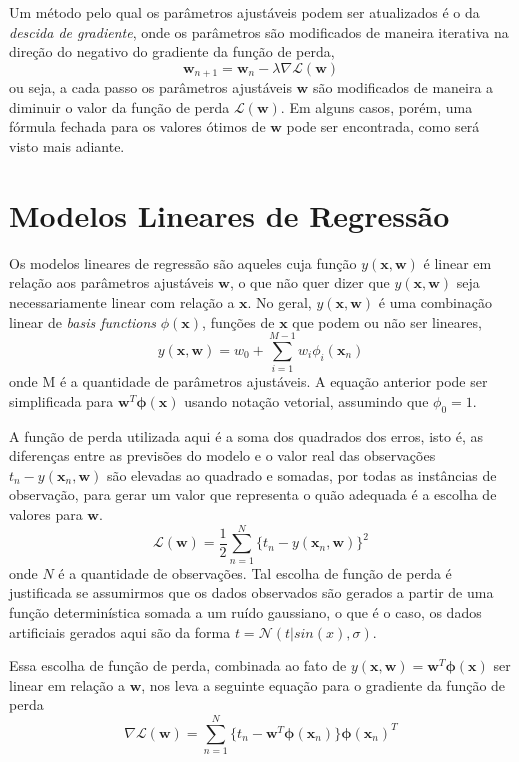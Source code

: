\documentclass{article}
\begin{document}
Um método pelo qual os parâmetros ajustáveis podem ser atualizados é o da \emph{descida de gradiente}, onde os parâmetros
são modificados de maneira iterativa na direção do negativo do gradiente da função de perda,
\[ \textbf{w}_{n + 1} = \textbf{w}_n - \lambda \nabla \mathcal{L}(\textbf{w}) \]
ou seja, a cada passo os parâmetros ajustáveis \( \textbf{w} \) são modificados de maneira a diminuir o valor da
função de perda \( \mathcal{L}(\textbf{w}) \). Em alguns casos, porém, uma fórmula fechada para os valores ótimos de \( \textbf{w} \)
pode ser encontrada, como será visto mais adiante.

\section{Modelos Lineares de Regressão}

Os modelos lineares de regressão são aqueles cuja função \( y(\textbf{x}, \textbf{w}) \) é linear em relação aos parâmetros
ajustáveis \( \textbf{w} \), o que não quer dizer que \( y(\textbf{x}, \textbf{w}) \) seja necessariamente linear com relação
a \( \textbf{x} \). No geral, \( y(\textbf{x}, \textbf{w}) \) é uma combinação linear de \emph{basis functions}
\( \phi(\textbf{x}) \), funções de \( \textbf{x} \) que podem ou não ser lineares,
\[ y(\textbf{x}, \textbf{w}) = w_0 + \sum_{i=1}^{M-1} w_i \phi_i(\textbf{x}_n) \]
onde M é a quantidade de parâmetros ajustáveis. A equação anterior pode ser simplificada para \( \textbf{w}^T \boldsymbol{\phi}(\textbf{x}) \)
usando notação vetorial, assumindo que \( \phi_0 = 1 \).

A função de perda utilizada aqui é a soma dos quadrados dos erros, isto é, as diferenças entre as previsões do modelo e o
valor real das observações \( t_n - y(\textbf{x}_n, \textbf{w}) \) são elevadas ao quadrado e somadas, por todas as instâncias
de observação, para gerar um valor que representa o quão adequada é a escolha de valores para \(\textbf{w}\).
\[ \mathcal{L}(\textbf{w}) = \frac{1}{2} \sum_{n=1}^{N} \{ t_n - y(\textbf{x}_n, \textbf{w})\}^2 \]
onde \(N\) é a quantidade de observações. Tal escolha de função de perda é justificada se assumirmos que os dados observados
são gerados a partir de uma função determinística somada a um ruído gaussiano, o que é o caso, os dados artificiais gerados aqui
são da forma \( t = \mathcal{N}(t | sin(x), \sigma) \).

Essa escolha de função de perda, combinada ao fato de \( y(\textbf{x}, \textbf{w}) = \textbf{w}^T \boldsymbol{\phi}(\textbf{x}) \) ser linear
em relação a \( \textbf{w} \), nos leva a seguinte equação para o gradiente da função de perda
\[ \nabla \mathcal{L}(\textbf{w}) = \sum_{n=1}^{N} \{ t_n - \textbf{w}^T \boldsymbol{\phi}(\textbf{x}_n) \} \boldsymbol{\phi}(\textbf{x}_n)^T \]
\end{document}

